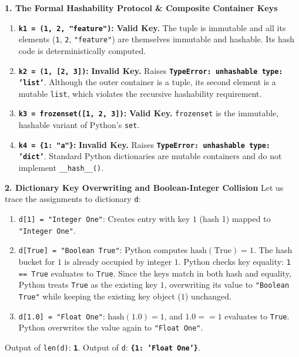 \textbf{1. The Formal Hashability Protocol \& Composite Container Keys}
\begin{enumerate}
    \item \textbf{\texttt{k1 = (1, 2, "feature")}:}
    \textbf{Valid Key.}
    The tuple is immutable and all its elements (\texttt{1}, \texttt{2}, \texttt{"feature"}) are themselves immutable and hashable. Its hash code is deterministically computed.
    \item \textbf{\texttt{k2 = (1, [2, 3])}:}
    \textbf{Invalid Key.}
    Raises \textbf{\texttt{TypeError: unhashable type: 'list'}}.
    Although the outer container is a tuple, its second element is a mutable \texttt{list}, which violates the recursive hashability requirement.
    \item \textbf{\texttt{k3 = frozenset([1, 2, 3])}:}
    \textbf{Valid Key.}
    \texttt{frozenset} is the immutable, hashable variant of Python's \texttt{set}.
    \item \textbf{\texttt{k4 = \{1: "a"\}}:}
    \textbf{Invalid Key.}
    Raises \textbf{\texttt{TypeError: unhashable type: 'dict'}}.
    Standard Python dictionaries are mutable containers and do not implement \texttt{\_\_hash\_\_()}.
\end{enumerate}

\textbf{2. Dictionary Key Overwriting and Boolean-Integer Collision}
Let us trace the assignments to dictionary \texttt{d}:
\begin{enumerate}
    \item \texttt{d[1] = "Integer One"}: Creates entry with key $1$ (hash 1) mapped to \texttt{"Integer One"}.
    \item \texttt{d[True] = "Boolean True"}: Python computes $\text{hash}(\text{True}) = 1$. The hash bucket for $1$ is already occupied by integer $1$. Python checks key equality: \texttt{1 == True} evaluates to \texttt{True}. Since the keys match in both hash and equality, Python treats \texttt{True} as the existing key $1$, overwriting its value to \texttt{"Boolean True"} while keeping the existing key object ($1$) unchanged.
    \item \texttt{d[1.0] = "Float One"}: $\text{hash}(1.0) = 1$, and $1.0 == 1$ evaluates to \texttt{True}. Python overwrites the value again to \texttt{"Float One"}.
\end{enumerate}
Output of \texttt{len(d)}: \textbf{\texttt{1}}.
Output of \texttt{d}: \textbf{\texttt{\{1: 'Float One'\}}}.

